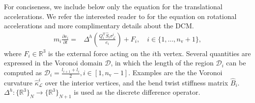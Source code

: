 For conciseness, we include below only the equation for the translational accelerations. We refer the interested reader to \cite{gazzola2018forward} for the equation on rotational accelerations and more complimentary details about the \gls{DCM}.
\begin{align}
    m_i \frac{\partial v_i}{\partial t} =& \Delta^h \left ( \frac{Q_i^\mathrm{T} \hat{S}_i \sigma^i_{\mathcal{L}}}{e_i} \right ) + F_i, \quad i\in \{1,\dots,n_\mathrm{v}+1\},
\end{align}
where $F_i \in \mathbb{R}^3$ is the external force acting on the $i$th vertex.
Several quantities are expressed in the Voronoi domain $\mathcal{D}$, in which the length of the region $\mathcal{D}_i$ can be computed as $\mathcal{D}_i = \frac{l_{i+1} + l_i}{2}, i \in [1,n_\mathrm{v}-1]$. Examples are the %
the Voronoi curvature $\hat{\kappa}_{\mathcal{L}}^i$ over the interior vertices, and the bend twist stiffness matrix $\hat{B}_i$.
$\Delta^h : \{\mathbb{R}^3 \}_N \rightarrow \{ \mathbb{R}^3 \}_{N+1}$ is used as the discrete difference operator.


